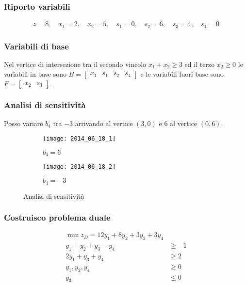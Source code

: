 \documentclass[\main/main.tex]{subfiles}
\begin{document}
\subsubsection*{Riporto variabili}

\begin{align*}
  z = 8, \quad
  x_1 = 2, \quad
  x_2 = 5, \quad
  s_1 = 0, \quad
  s_2 = 6, \quad
  s_3 = 4, \quad
  s_4 = 0
\end{align*}
\subsubsection*{Variabili di base}
Nel vertice di intersezione tra il secondo vincolo $x_1 + x_2  \geq 3$ ed il terzo $x_2 \geq 0$ le variabili in base sono $B = \begin{bmatrix}
    x_1 & s_1 & s_2 & s_4
  \end{bmatrix}$ e le variabili fuori base sono $F = \begin{bmatrix}
    x_2 & s_3
  \end{bmatrix}$.

\subsubsection*{Analisi di sensitività}
Posso variare $b_4$ tra $-3$ arrivando al vertice $(3,0)$ e $6$ al vertice $(0,6)$.

\begin{figure}
  \begin{subfigure}{0.49\textwidth}
    \texttt{[image: 2014\_06\_18\_1]}
    \caption{$b_4 = 6$}
  \end{subfigure}
  \begin{subfigure}{0.49\textwidth}
    \texttt{[image: 2014\_06\_18\_2]}
    \caption{$b_4 = -3$}
  \end{subfigure}
  \caption{Analisi di sensitività}
\end{figure}

\subsubsection*{Costruisco problema duale}
\begin{align*}
  \min z_D = 12y_1 + 8y_2 + 3y_3 + 3y_4 \\
  y_1 + y_2 + y_3 -y_4 & \geq -1        \\
  2y_1 + y_3 + y_4     & \geq 2         \\
  y_1, y_2, y_4        & \geq 0         \\
  y_3                  & \leq 0
\end{align*}
\end{document}
